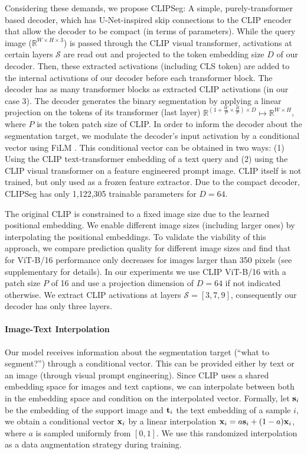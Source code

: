 Considering these demands, we propose CLIPSeg: A simple, purely-transformer based decoder, which has U-Net-inspired skip connections to the CLIP encoder that allow the decoder to be compact (in terms of parameters). %
While the query image ($\mathbb{R}^{W \times H \times 3}$) is passed through the CLIP visual transformer, activations at certain layers $\mathcal{S}$ are read out and projected to the token embedding size $D$ of our decoder. 
Then, these extracted activations (including CLS token) are added to the internal activations of our decoder before each transformer block. The decoder has as many transformer blocks as extracted CLIP activations (in our case 3).
The decoder generates the binary segmentation by applying a linear projection on the tokens of its transformer (last layer) $\mathbb{R}^{(1 + \frac{W}{P} \times \frac{H}{P}) \times D} \mapsto  \mathbb{R}^{W \times H}$, where $P$ is the token patch size of CLIP.
In order to inform the decoder about the segmentation target, we modulate the decoder's input activation by a conditional vector using FiLM \cite{dumoulin18}. 
This conditional vector can be obtained in two ways: (1) Using the CLIP text-transformer embedding of a text query and (2) using the CLIP visual transformer on a feature engineered prompt image. 
CLIP itself is not trained, but only used as a frozen feature extractor. Due to the compact decoder, CLIPSeg has only 1,122,305 trainable parameters for $D=64$.

The original CLIP is constrained to a fixed image size due to the learned positional embedding. We enable different image sizes (including larger ones) by interpolating the positional embeddings. To validate the viability of this approach, we compare prediction quality for different image sizes and find that for ViT-B/16 performance only decreases for images larger than 350 pixels (see supplementary for details).
In our experiments we use CLIP ViT-B/16 with a patch size $P$ of 16 and use a projection dimension of $D = 64$ if not indicated otherwise. We extract CLIP activations at layers $\mathcal{S} = [3,7,9]$, consequently our decoder has only three layers.

\paragraph{Image-Text Interpolation}
\label{sec:text_image_interpolation}
Our model receives information about the segmentation target (``what to segment?'') through a conditional vector. This can be provided either by text or an image (through visual prompt engineering). Since CLIP uses a shared embedding space for images and text captions, we can interpolate between both in the embedding space and condition on the interpolated vector.
Formally, let $\mathbf{s}_i$ be the embedding of the support image and $\mathbf{t}_i$ the text embedding of a sample $i$, we obtain a conditional vector $\mathbf{x}_i$ by a linear interpolation $\mathbf{x}_i= a \mathbf{s}_i + (1-a) \mathbf{x}_i$, where $a$ is sampled uniformly from $[0, 1]$. 
We use this randomized interpolation as a data augmentation strategy during training.

